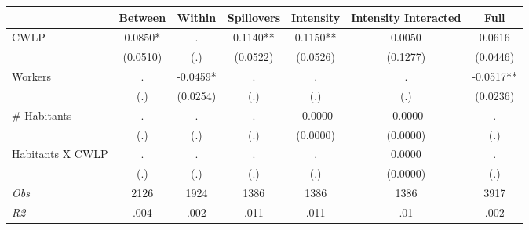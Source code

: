\begin{tabular}{l*{6}{c}}\hline&\multicolumn{1}{c}{Between}&\multicolumn{1}{c}{Within}&\multicolumn{1}{c}{Spillovers}&\multicolumn{1}{c}{Intensity}&\multicolumn{1}{c}{Intensity Interacted}&\multicolumn{1}{c}{Full}\\ \hline 
CWLP & 0.0850* & . & 0.1140** & 0.1150** & 0.0050 & 0.0616 \\
 & (0.0510) & (.) & (0.0522) & (0.0526) & (0.1277) & (0.0446) \\
Workers & . & -0.0459* & . & . & . & -0.0517** \\
 & (.) & (0.0254) & (.) & (.) & (.) & (0.0236) \\
\# Habitants & . & . & . & -0.0000 & -0.0000 & . \\
 & (.) & (.) & (.) & (0.0000) & (0.0000) & (.) \\
Habitants X CWLP & . & . & . & . & 0.0000 & . \\
 & (.) & (.) & (.) & (.) & (0.0000) & (.) \\
\hline \textit{Obs} & 2126 & 1924 & 1386 & 1386 & 1386 & 3917 \\ \textit{R2} & .004 & .002 & .011 & .011 & .01 & .002 \\ \hline \end{tabular}

